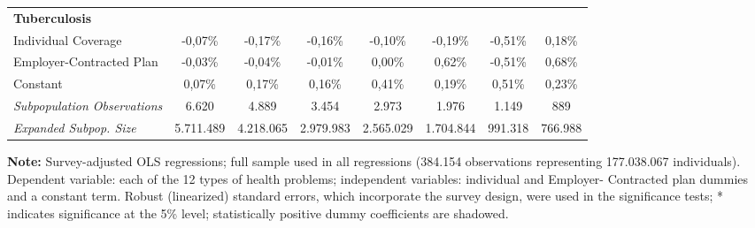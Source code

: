 \documentclass{article}
\begin{document}
\begin{table*}
{\begin{tabular}{l*{7}{c}}
\midrule
\textbf{Tuberculosis} & & & & & & & \\

Individual Coverage &  -0,07\%  &  -0,17\%\sym{*}  &  -0,16\%  &  -0,10\%  &  -0,19\%  &  -0,51\%  &   0,18\% \\
Employer-Contracted Plan&  -0,03\%  &  -0,04\%  &  -0,01\%  &   0,00\%  &   0,62\%  &  -0,51\%  &   0,68\% \\
Constant            &   0,07\%  &   0,17\%\sym{*}  &   0,16\%  &   0,41\%\sym{**} &   0,19\%  &   0,51\%  &   0,23\% \\

\midrule

\textit{Subpopulation Observations} 	&    6.620 & 4.889 & 3.454 & 2.973 & 1.976 & 1.149 & 889         \\
\textit{Expanded Subpop. Size} 		&   5.711.489 &  4.218.065 &  2.979.983 &  2.565.029 &  1.704.844  &   991.318   &  766.988          \\

	\hline \hline

\end{tabular}}
\justify \small {} \textbf{Note:} Survey-adjusted OLS regressions; full sample used in all regressions (384.154 observations representing 177.038.067
individuals). Dependent variable: each of the 12 types of health problems; independent variables: individual and Employer-
Contracted plan dummies and a constant term. Robust (linearized) standard errors, which incorporate the survey design, were
used in the significance tests; * indicates significance at the 5\% level; statistically positive dummy coefficients are shadowed.
\end{table*}




\newpage
\end{document}
